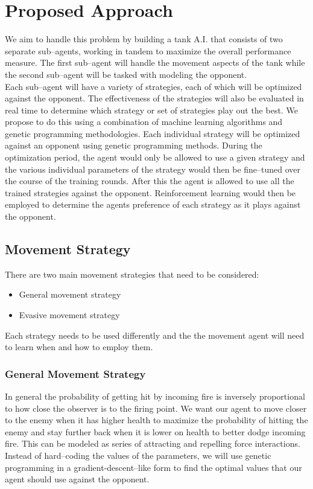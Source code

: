\documentclass{article}
\theoremstyle{plain}
\theoremstyle{definition}
\theoremstyle{remark}
\begin{document}
\section*{Proposed Approach}

We aim to handle this problem by building a tank A.I. that consists of two separate sub--agents, working in tandem to maximize the overall performance measure. The first sub--agent will handle the movement aspects of the tank while the second sub--agent will be tasked with modeling the opponent.\\

Each sub--agent will have a variety of strategies, each of which will be optimized against the opponent. The effectiveness of the strategies will also be evaluated in real time to determine which strategy or set of strategies play out the best. We propose to do this using a combination of machine learning algorithms and genetic programming methodologies. Each individual strategy will be optimized against an opponent using genetic programming methods. During the optimization period, the agent would only be allowed to use a given strategy and the various individual parameters of the strategy would then be fine--tuned over the course of the training rounds. After this the agent is allowed to use all the trained strategies against the opponent. Reinforcement learning would then be employed to determine the agents preference of each strategy as it plays against the opponent.

\subsection*{Movement Strategy}

There are two main movement strategies that need to be considered:
\begin{itemize}

\item General movement strategy

\item Evasive movement strategy
\end{itemize}

Each strategy needs to be used differently and the the movement agent will need to learn when and how to employ them.

\subsubsection*{General Movement Strategy}
In general the probability of getting hit by incoming fire is inversely proportional to how close the observer is to the firing point. We want our agent to move closer to the enemy when it has higher health to maximize the probability of hitting the enemy and stay further back when it is lower on health to better dodge incoming fire. This can be modeled as series of attracting and repelling force interactions. Instead of hard--coding the values of the parameters, we will use genetic programming in a gradient-descent--like form to find the optimal values that our agent should use against the opponent.
\end{document}
